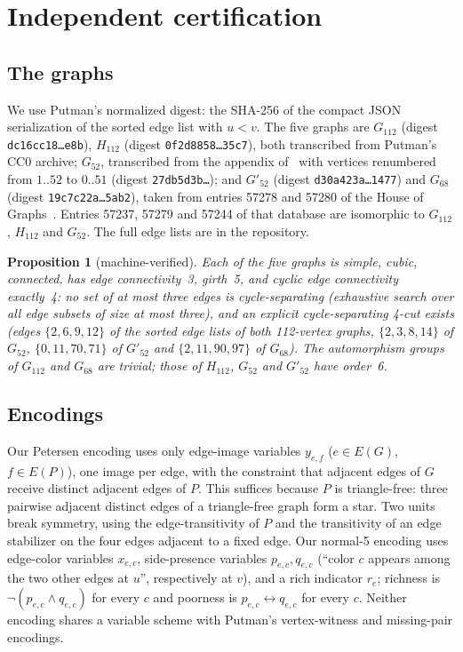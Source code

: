 \documentclass[11pt]{article}
\newtheorem{proposition}[theorem]{Proposition}
\theoremstyle{definition}
\theoremstyle{remark}
\newcommand{\PG}{P}
\newcommand{\Gmain}{G_{112}}
\newcommand{\Gsym}{H_{112}}
\newcommand{\Gfty}{G_{52}}
\newcommand{\Gftyb}{G'_{52}}
\newcommand{\Gsix}{G_{68}}
\begin{document}
\section{Independent certification}\label{sec:certify}

\subsection{The graphs}

We use Putman's normalized digest: the SHA-256 of the compact JSON serialization of the sorted
edge list with $u < v$. The five graphs are
$\Gmain$ (digest \texttt{dc16cc18\ldots{}e8b}), $\Gsym$ (digest \texttt{0f2d8858\ldots{}35c7}),
both transcribed from Putman's CC0 archive; $\Gfty$, transcribed from the appendix
of~\cite{GJMMM2026} with vertices renumbered from $1..52$ to $0..51$ (digest
\texttt{27db5d3b\ldots}); and $\Gftyb$ (digest \texttt{d30a423a\ldots{}1477}) and $\Gsix$ (digest
\texttt{19c7c22a\ldots{}5ab2}), taken from entries 57278 and 57280 of the House of
Graphs~\cite{HoG}. Entries 57237, 57279 and 57244 of that database are isomorphic to $\Gmain$,
$\Gsym$ and $\Gfty$. The full edge lists are in the repository.

\begin{proposition}[machine-verified]\label{prop:structure}
Each of the five graphs is simple, cubic, connected, has edge connectivity~3, girth~5,
and cyclic edge connectivity exactly~4: no set of at most three edges is cycle-separating
(exhaustive search over all edge subsets of size at most three), and an explicit cycle-separating
4-cut exists (edges $\{2,6,9,12\}$ of the sorted edge lists of both 112-vertex graphs,
$\{2,3,8,14\}$ of $\Gfty$, $\{0,11,70,71\}$ of $\Gftyb$ and $\{2,11,90,97\}$ of $\Gsix$). The
automorphism groups of $\Gmain$ and $\Gsix$ are trivial; those of $\Gsym$, $\Gfty$ and $\Gftyb$
have order~6.
\end{proposition}

\subsection{Encodings}

Our Petersen encoding uses only edge-image variables $y_{e,f}$ ($e \in E(G)$, $f \in E(\PG)$), one
image per edge, with the constraint that adjacent edges of $G$ receive distinct adjacent edges of
$\PG$. This suffices because $\PG$ is triangle-free: three pairwise adjacent distinct edges of a
triangle-free graph form a star. Two units break symmetry, using the edge-transitivity of $\PG$
and the transitivity of an edge stabilizer on the four edges adjacent to a fixed edge. Our
normal-5 encoding uses edge-color variables $x_{e,c}$, side-presence variables $p_{e,c}, q_{e,c}$
(``color $c$ appears among the two other edges at $u$'', respectively at $v$), and a rich
indicator $r_e$; richness is $\lnot(p_{e,c} \land q_{e,c})$ for every $c$ and poorness is
$p_{e,c} \leftrightarrow q_{e,c}$ for every $c$. Neither encoding shares a variable scheme with
Putman's vertex-witness and missing-pair encodings.
\end{document}
